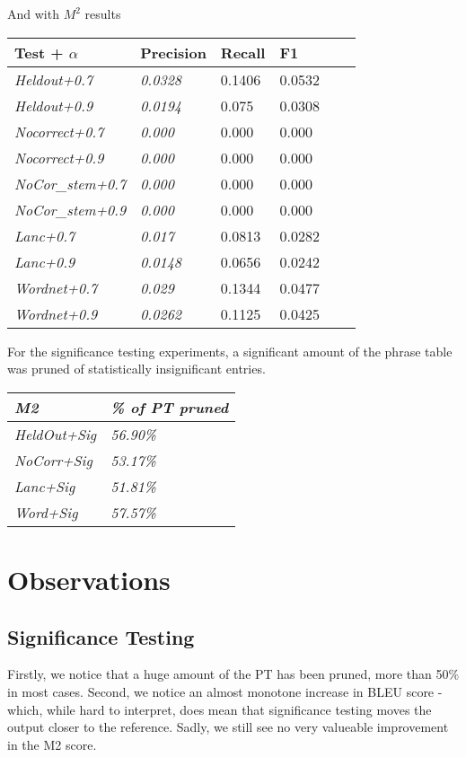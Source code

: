 \documentclass[11pt,letterpaper]{article}
\begin{document}
And with $M^2$ results \\

\begin{tabular}{ |l|l|l|l|l|l| }
\hline
\textbf{Test + $\alpha$} & \textbf{Precision} & \textbf{Recall} & \textbf{F1} \\ \hline
\textit{Heldout+0.7} & \textit{0.0328} & 0.1406 & 0.0532 \\ \hline
\textit{Heldout+0.9} & \textit{0.0194} & 0.075 & 0.0308 \\ \hline
\textit{Nocorrect+0.7} & \textit{0.000} & 0.000 & 0.000 \\ \hline
\textit{Nocorrect+0.9} & \textit{0.000} & 0.000 & 0.000 \\ \hline
\textit{NoCor\_stem+0.7} & \textit{0.000} & 0.000 & 0.000 \\ \hline
\textit{NoCor\_stem+0.9} & \textit{0.000} & 0.000 & 0.000 \\ \hline
\textit{Lanc+0.7} & \textit{0.017} & 0.0813 & 0.0282 \\ \hline
\textit{Lanc+0.9} & \textit{0.0148} & 0.0656 & 0.0242 \\ \hline
\textit{Wordnet+0.7} & \textit{0.029} & 0.1344 & 0.0477 \\ \hline
\textit{Wordnet+0.9} & \textit{0.0262} & 0.1125 & 0.0425 \\ \hline
\end{tabular}

For the significance testing experiments, a significant amount of the phrase table was pruned of statistically insignificant entries. \\

\begin{tabular}{|l|l|}
\hline
\textit{M2} & \textit{\% of PT pruned} \\ \hline
\textit{HeldOut+Sig} & \textit{56.90\%} \\ \hline
\textit{NoCorr+Sig} & \textit{53.17\%} \\ \hline
\textit{Lanc+Sig} & \textit{51.81\%} \\ \hline
\textit{Word+Sig} & \textit{57.57\%} \\ \hline
\end{tabular}

\section{Observations}

\subsection{Significance Testing}
\indent Firstly, we notice that a huge amount of the PT has been pruned, more than 50\% in most cases. Second, we notice an 
almost monotone increase in BLEU score - which, while hard to interpret, does mean that significance testing moves the 
output closer to the reference. Sadly, we still see no very valueable improvement in the M2 score. \newline
\end{document}
